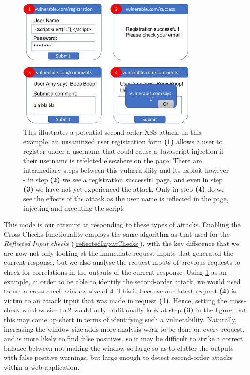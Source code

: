\begin{figure}[h]
	\centering
	\includegraphics[width=0.8\textwidth]{images/second_order_attack.png}
	\caption{This illustrates a potential second-order XSS attack. In this example, an unsanitized user registration form \textbf{(1)} allows a user to register under a username that could cause a Javascript injection if their username is refelcted elsewhere on the page. There are intermediary steps between this vulnerability and its exploit however - in step \textbf{(2)} we see a registration successful page, and even in step \textbf{(3)} we have not yet experienced the attack. Only in step \textbf{(4)} do we see the effects of the attack as the user name is reflected in the page, injecting and executing the script.}
	\label{fig:secondOrderAttack}
\end{figure}

This mode is our attempt at responding to these types of attacks. Enabling the Cross Checks functionality employs the same algorithm as that used for the \textit{Reflected Input checks} (\ref{reflectedInputChecks}), with the key difference that we are now not only looking at the immediate request inputs that generated the current response, but we also analyse the request inputs of previous requests to check for correlations in the outputs of the current response. Using \ref{fig:secondOrderAttack} as an example, in order to be able to identify the second-order attack, we would need to use a cross-check window size of 4. This is because our latest request \textbf{(4)} is victim to an attack input that was made in request \textbf{(1)}. Hence, setting the cross-check window size to 2 would only additionally look at step \textbf{(3)} in the figure, but this may come up short in terms of identifying such a vulnerability. Naturally, increasing the window size adds more analysis work to be done on every request, and is more likely to find false positives, so it may be difficult to strike a correct balance between not making the window so large so as to clutter the outputs with false positive warnings, but large enough to detect second-order attacks within a web application.


